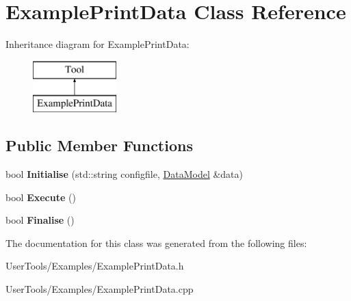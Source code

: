 \hypertarget{classExamplePrintData}{\section{Example\-Print\-Data Class Reference}
\label{classExamplePrintData}
}
Inheritance diagram for Example\-Print\-Data\-:\begin{figure}[H]
\begin{center}
\leavevmode
\includegraphics[height=2.000000cm]{classExamplePrintData}
\end{center}
\end{figure}
\subsection*{Public Member Functions}
\begin{DoxyCompactItemize}
\item 
\hypertarget{classExamplePrintData_a307dfd08e3e97a41630506b1796dc89f}{bool {\bfseries Initialise} (std\-::string configfile, \hyperlink{classDataModel}{Data\-Model} \&data)}\label{classExamplePrintData_a307dfd08e3e97a41630506b1796dc89f}

\item 
\hypertarget{classExamplePrintData_aa976e0555bc68a07f9525f556bb51352}{bool {\bfseries Execute} ()}\label{classExamplePrintData_aa976e0555bc68a07f9525f556bb51352}

\item 
\hypertarget{classExamplePrintData_a6b47fdbb41a982a082857c3fd94ac7a9}{bool {\bfseries Finalise} ()}\label{classExamplePrintData_a6b47fdbb41a982a082857c3fd94ac7a9}

\end{DoxyCompactItemize}


The documentation for this class was generated from the following files\-:\begin{DoxyCompactItemize}
\item 
User\-Tools/\-Examples/Example\-Print\-Data.\-h\item 
User\-Tools/\-Examples/Example\-Print\-Data.\-cpp\end{DoxyCompactItemize}
